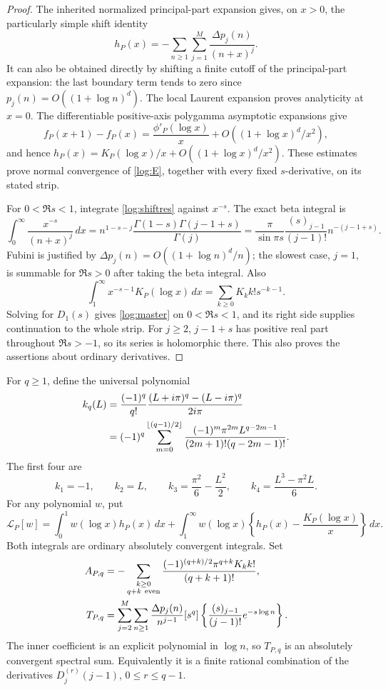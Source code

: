 \begin{proof}
The inherited normalized principal-part expansion \cite[Section 2]{DPL}
gives, on
$x>0$, the particularly simple shift identity
\begin{equation}\label{log:shiftres}
 h_P(x)=-\sum_{n\ge1}\sum_{j=1}^M
          \frac{\Delta p_j(n)}{(n+x)^j}.
\end{equation}
It can also be obtained directly by shifting a finite cutoff of the
principal-part expansion: the last boundary term tends to zero since
$p_j(n)=O((1+\log n)^d)$.
The local Laurent expansion proves analyticity at $x=0$.
The differentiable positive-axis polygamma asymptotic expansions give
\[
 f_P(x+1)-f_P(x)=\frac{\phi'_P(\log x)}x
                   +O((1+\log x)^d/x^2),
\]
and hence
$h_P(x)=K_P(\log x)/x+O((1+\log x)^d/x^2)$.
These estimates prove normal convergence of \eqref{log:E}, together
with every fixed $s$-derivative, on its stated strip.

For $0<\Re s<1$, integrate \eqref{log:shiftres} against $x^{-s}$.
The exact beta integral is
\[
 \int_0^\infty\frac{x^{-s}}{(n+x)^j}\,dx
 =n^{1-s-j}\frac{\Gamma(1-s)\Gamma(j-1+s)}{\Gamma(j)}
 =\frac{\pi}{\sin\pi s}\frac{(s)_{j-1}}{(j-1)!}
   n^{-(j-1+s)}.
\]
Fubini is justified by
$\Delta p_j(n)=O((1+\log n)^d/n)$; the slowest case, $j=1$,
is summable for $\Re s>0$ after taking the beta integral.
Also
\[
 \int_1^\infty x^{-s-1}K_P(\log x)\,dx
       =\sum_{k\ge0}K_k k!s^{-k-1}.
\]
Solving for $D_1(s)$ gives \eqref{log:master} on $0<\Re s<1$,
and its right side supplies continuation to the whole strip.
For $j\ge2$, $j-1+s$ has positive real part throughout
$\Re s>-1$, so its series is holomorphic there. This also proves
the assertions about ordinary derivatives.
\end{proof}

For $q\ge1$, define the universal polynomial
\begin{align}\label{log:kernel}
 k_q(L)&=\frac{(-1)^q}{q!}
          \frac{(L+i\pi)^q-(L-i\pi)^q}{2i\pi}\notag\\
 &=(-1)^q\sum_{m=0}^{\lfloor(q-1)/2\rfloor}
       \frac{(-1)^m\pi^{2m}L^{q-2m-1}}
            {(2m+1)!(q-2m-1)!}.
\end{align}
The first four are
\[
 k_1=-1,\qquad k_2=L,\qquad
 k_3=\frac{\pi^2}{6}-\frac{L^2}{2},\qquad
 k_4=\frac{L^3-\pi^2L}{6}.
\]
For any polynomial $w$, put
\[
 \mathcal L_P[w]=\int_0^1w(\log x)h_P(x)\,dx+
 \int_1^\infty w(\log x)
       \left\{h_P(x)-\frac{K_P(\log x)}x\right\}\,dx.
\]
Both integrals are ordinary absolutely convergent integrals.
Set
\begin{align}\label{log:constants}
 A_{P,q}&=-\sum_{\substack{k\ge0\\q+k\ \mathrm{even}}}
        \frac{(-1)^{(q+k)/2}\pi^{q+k}K_k k!}{(q+k+1)!},\notag\\
 T_{P,q}&=\sum_{j=2}^M\sum_{n\ge1}
       \frac{\Delta p_j(n)}{n^{j-1}}
       [s^q]\left\{\frac{(s)_{j-1}}{(j-1)!}e^{-s\log n}\right\}.
\end{align}
The inner coefficient is an explicit polynomial in $\log n$, so
$T_{P,q}$ is an absolutely convergent spectral sum. Equivalently it
is a finite rational combination of the derivatives
$D_j^{(r)}(j-1)$, $0\le r\le q-1$.

